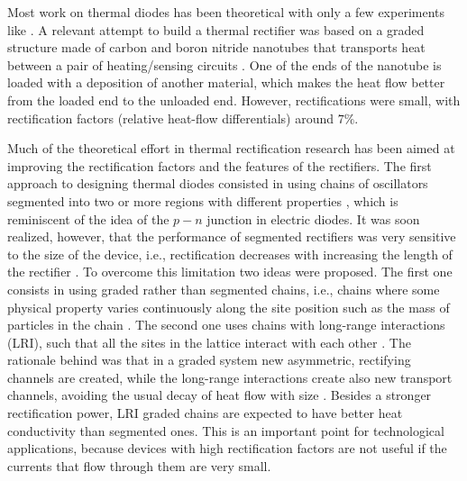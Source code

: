 Most work on thermal diodes has been theoretical with only a few experiments
like \cite{Chang2006,Kobayashi2009,Leitner2013,Elzouka2017}.
A relevant attempt to build a thermal rectifier was based on a graded structure made of carbon and boron nitride nanotubes that transports heat between a pair of heating/sensing circuits \cite{Chang2006}. One of the ends of the nanotube is loaded with a deposition of another material, which makes the heat flow better from the loaded end to the unloaded end. However, rectifications were small, with rectification factors (relative
heat-flow differentials) around $7\%$.

Much of the theoretical effort in thermal rectification research has been aimed at improving the rectification factors and the features of the rectifiers. The first approach to designing thermal diodes consisted in using chains of oscillators segmented into two or more regions with different properties \cite{Terraneo2002,Li2004,Li2008,Hu2006}, which is reminiscent of the idea of the $p-n$ junction in electric diodes. It was soon realized, however, that the performance of segmented rectifiers was very sensitive to the size of the device, i.e., rectification decreases with increasing the length of the rectifier \cite{Hu2006}. To overcome this limitation two ideas were proposed. The first one consists in using graded rather than segmented chains, i.e., chains where some physical property varies continuously along the site position such as the mass of particles in the chain \cite{Wang2012,Chen2015,Romero-Bastida2017,Yang2007,Romero-Bastida2013,Dettori2016,Pereira2010,Pereira2011,Avila2013}. The second one uses chains with long-range interactions (LRI), such that all the sites in the lattice interact with each other \cite{Chen2015,Bagchi2017,Pereira2013}. The rationale behind was that in a graded system new asymmetric, rectifying channels are created, while the long-range interactions create
also new transport channels, avoiding the usual decay of heat flow with size \cite{Chen2015}. Besides a stronger rectification power, LRI graded chains are expected to have better heat conductivity than segmented ones. This is an important point for technological applications, because devices with high rectification factors are not useful if the currents that flow through them are very small.

